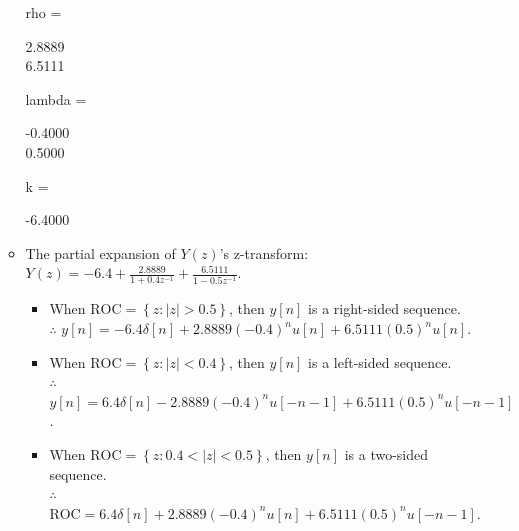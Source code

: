 \documentclass[onecolumn,oneside]{SUSTechHomework}
\begin{document}
\begin{itemize}
\begin{itemize}
\begin{commandline}
            rho =
            
                2.8889\\
                6.5111
            
            
            lambda =
            
               -0.4000\\
                0.5000
            
            
            k =
            
               -6.4000            
        \end{commandline}
        \item The partial expansion of $Y(z)$'s z-transform: $Y(z)=-6.4+\frac{2.8889}{1+0.4z^{-1}}+\frac{6.5111}{1-0.5z^{-1}}$.
        \begin{itemize}
            \item When $\text{ROC}=\left\{z:|z|>0.5\right\}$, then $y[n]$ is a right-sided sequence.\\
            $\therefore$ $y[n]=-6.4\delta[n]+2.8889(-0.4)^nu[n]+6.5111(0.5)^nu[n]$.
            \item When $\text{ROC}=\left\{z:|z|<0.4\right\}$, then $y[n]$ is a left-sided sequence.\\
            $\therefore$ $y[n]=6.4\delta[n]-2.8889(-0.4)^nu[-n-1]+6.5111(0.5)^nu[-n-1]$.
            \item When $\text{ROC}=\left\{z:0.4<|z|<0.5\right\}$, then $y[n]$ is a two-sided sequence.\\
            $\therefore$ $\text{ROC}=6.4\delta[n]+2.8889(-0.4)^nu[n]+6.5111(0.5)^nu[-n-1]$.
        \end{itemize} 
    \end{itemize}
\end{itemize}
\end{document}
